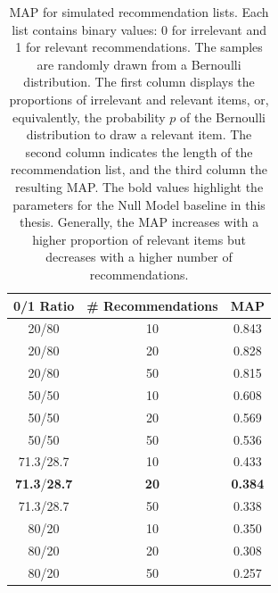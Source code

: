 \begin{table}[htb!]
    \centering
    \begin{tabular}{ccc}
        \toprule
        \textbf{0/1 Ratio}          & \textbf{\# Recommendations} & \textbf{MAP}   \\
        \midrule
        20/80                       & 10                          & 0.843          \\
        20/80                       & 20                          & 0.828          \\
        20/80                       & 50                          & 0.815          \\
        50/50                       & 10                          & 0.608          \\
        50/50                       & 20                          & 0.569          \\
        50/50                       & 50                          & 0.536          \\
        71.3/28.7                   & 10                          & 0.433          \\
        \textbf{71.3}/\textbf{28.7} & \textbf{20}                 & \textbf{0.384} \\
        71.3/28.7                   & 50                          & 0.338          \\
        80/20                       & 10                          & 0.350          \\
        80/20                       & 20                          & 0.308          \\
        80/20                       & 50                          & 0.257          \\
        \bottomrule
    \end{tabular}
    \caption[Baseline \acs{MAP} Scores]{\ac{MAP} for simulated recommendation lists. Each list contains binary values: 0 for irrelevant and 1 for relevant recommendations. The samples are randomly drawn from a Bernoulli distribution.
        The first column displays the proportions of irrelevant and relevant items, or, equivalently, the probability $p$ of the Bernoulli distribution to draw a relevant item.
        The second column indicates the length of the recommendation list, and the third column the resulting \ac{MAP}. The bold values highlight the parameters for the Null Model baseline in this thesis. Generally, the \ac{MAP} increases with a higher proportion of relevant items but decreases with a higher number of recommendations.}
    \label{tab:baseline-map}
\end{table}


